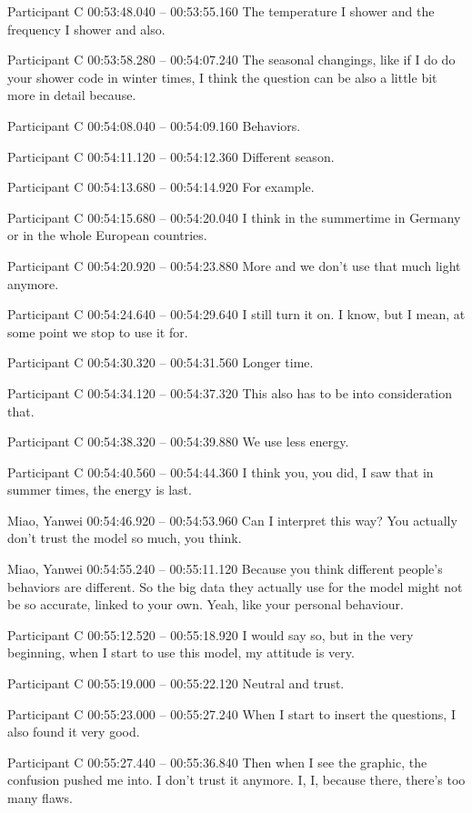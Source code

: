{Participant C 00:53:48.040 -- 00:53:55.160
The temperature I shower and the frequency I shower and also.

Participant C 00:53:58.280 -- 00:54:07.240
The seasonal changings, like if I do do your shower code in winter times, I think the question can be also a little bit more in detail because.

Participant C 00:54:08.040 -- 00:54:09.160
Behaviors.

Participant C 00:54:11.120 -- 00:54:12.360
Different season.

Participant C 00:54:13.680 -- 00:54:14.920
For example.

Participant C 00:54:15.680 -- 00:54:20.040
I think in the summertime in Germany or in the whole European countries.

Participant C 00:54:20.920 -- 00:54:23.880
More and we don't use that much light anymore.

Participant C 00:54:24.640 -- 00:54:29.640
I still turn it on. I know, but I mean, at some point we stop to use it for.

Participant C 00:54:30.320 -- 00:54:31.560
Longer time.

Participant C 00:54:34.120 -- 00:54:37.320
This also has to be into consideration that.

Participant C 00:54:38.320 -- 00:54:39.880
We use less energy.

Participant C 00:54:40.560 -- 00:54:44.360
I think you, you did, I saw that in summer times, the energy is last.

Miao, Yanwei 00:54:46.920 -- 00:54:53.960
Can I interpret this way? You actually don't trust the model so much, you think.

Miao, Yanwei 00:54:55.240 -- 00:55:11.120
Because you think different people's behaviors are different. So the big data they actually use for the model might not be so accurate, linked to your own. Yeah, like your personal behaviour.

Participant C 00:55:12.520 -- 00:55:18.920
I would say so, but in the very beginning, when I start to use this model, my attitude is very.

Participant C 00:55:19.000 -- 00:55:22.120
Neutral and trust.

Participant C 00:55:23.000 -- 00:55:27.240
When I start to insert the questions, I also found it very good.

Participant C 00:55:27.440 -- 00:55:36.840
Then when I see the graphic, the confusion pushed me into. I don't trust it anymore. I, I, because there, there's too many flaws.

}
